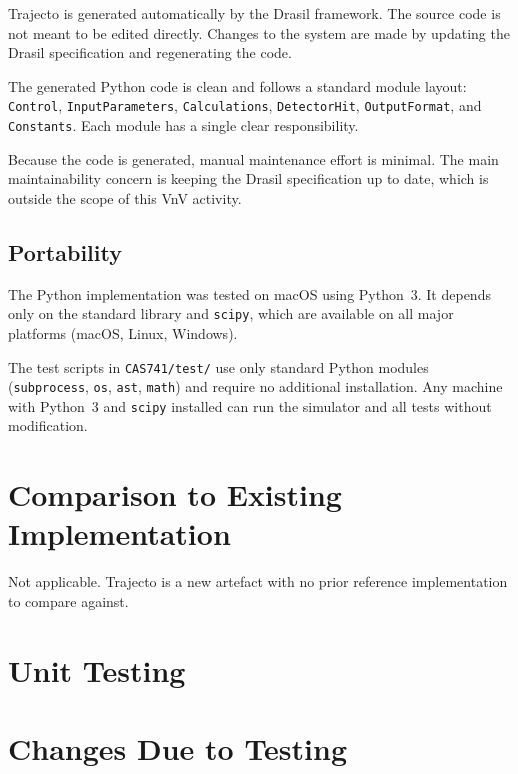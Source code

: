 \documentclass[12pt, titlepage]{article}
\begin{document}
Trajecto is generated automatically by the Drasil framework.
The source code is not meant to be edited directly.
Changes to the system are made by updating the Drasil specification and
regenerating the code.

The generated Python code is clean and follows a standard module layout:
\texttt{Control}, \texttt{InputParameters}, \texttt{Calculations},
\texttt{DetectorHit}, \texttt{OutputFormat}, and \texttt{Constants}.
Each module has a single clear responsibility.

Because the code is generated, manual maintenance effort is minimal.
The main maintainability concern is keeping the Drasil specification up to
date, which is outside the scope of this VnV activity.

\subsection{Portability}

The Python implementation was tested on macOS using Python~3.
It depends only on the standard library and \texttt{scipy}, which are
available on all major platforms (macOS, Linux, Windows).

The test scripts in \texttt{CAS741/test/} use only standard Python modules
(\texttt{subprocess}, \texttt{os}, \texttt{ast}, \texttt{math}) and require
no additional installation.
Any machine with Python~3 and \texttt{scipy} installed can run the simulator
and all tests without modification.

\section{Comparison to Existing Implementation}

Not applicable. Trajecto is a new artefact with no prior reference
implementation to compare against.

\section{Unit Testing}

\section{Changes Due to Testing}
\end{document}
